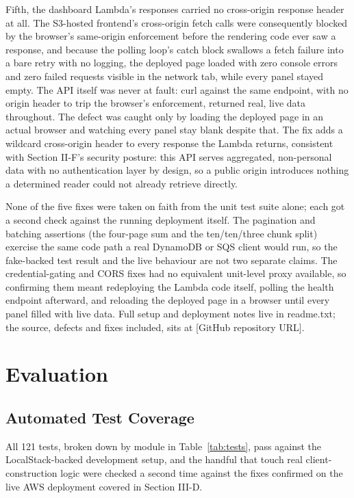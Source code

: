 \documentclass[conference]{IEEEtran}
\begin{document}
Fifth, the dashboard Lambda's responses carried no cross-origin response header at all. The S3-hosted frontend's cross-origin fetch calls were consequently blocked by the browser's same-origin enforcement before the rendering code ever saw a response, and because the polling loop's catch block swallows a fetch failure into a bare retry with no logging, the deployed page loaded with zero console errors and zero failed requests visible in the network tab, while every panel stayed empty. The API itself was never at fault: curl against the same endpoint, with no origin header to trip the browser's enforcement, returned real, live data throughout. The defect was caught only by loading the deployed page in an actual browser and watching every panel stay blank despite that. The fix adds a wildcard cross-origin header to every response the Lambda returns, consistent with Section II-F's security posture: this API serves aggregated, non-personal data with no authentication layer by design, so a public origin introduces nothing a determined reader could not already retrieve directly.

None of the five fixes were taken on faith from the unit test suite alone; each got a second check against the running deployment itself. The pagination and batching assertions (the four-page sum and the ten/ten/three chunk split) exercise the same code path a real DynamoDB or SQS client would run, so the fake-backed test result and the live behaviour are not two separate claims. The credential-gating and CORS fixes had no equivalent unit-level proxy available, so confirming them meant redeploying the Lambda code itself, polling the health endpoint afterward, and reloading the deployed page in a browser until every panel filled with live data. Full setup and deployment notes live in readme.txt; the source, defects and fixes included, sits at [GitHub repository URL].

\section{Evaluation}
\subsection{Automated Test Coverage}
All 121 tests, broken down by module in Table~\ref{tab:tests}, pass against the LocalStack-backed development setup, and the handful that touch real client-construction logic were checked a second time against the fixes confirmed on the live AWS deployment covered in Section III-D.
\end{document}
